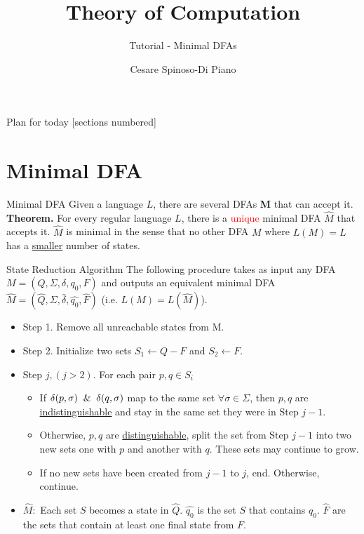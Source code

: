 \documentclass[10pt]{beamer}
\title{Theory of Computation}
\subtitle{Tutorial - Minimal DFAs}
\author{Cesare Spinoso-Di Piano}
\date{}
\begin{document}
\maketitle

\begin{frame}{Plan for today}
    [sections numbered]
    \tableofcontents[hideallsubsections]
\end{frame}


\section{Minimal DFA}

\begin{frame}{Minimal DFA}
    Given a language $L$, there are several DFAs \textbf{M} that can accept it.\\ \bigskip
    \textbf{Theorem.} For every regular language $L$, there is a \textcolor{red}{unique} minimal DFA $\hat{M}$ that accepts it. $\hat{M}$ is minimal in the sense that no other DFA $M$ where $L(M) = L$ has a \underline{smaller} number of states.
\end{frame}

\begin{frame}[t]{State Reduction Algorithm}
    The following procedure takes as input any DFA $M = (Q, \Sigma, \delta, q_0, F)$ and outputs an equivalent minimal DFA $\hat{M} = (\hat{Q}, \Sigma, \hat{\delta}, \hat{q_0}, \hat{F})$ (i.e. $L(M) = L(\hat{M})$).
    \begin{itemize}
        \item Step 1. Remove all unreachable states from M.
        \item Step 2. Initialize two sets $S_1 \leftarrow Q - F$ and $S_2 \leftarrow F$.
        \item Step $j, (j > 2)$. For each pair $p, q \in S_i$
              \begin{itemize}
                  \item If $\delta(p, \sigma) \And \delta(q, \sigma)$ map to the same set $\forall \sigma \in \Sigma$, then $p,q$ are \underline{indistinguishable} and stay in the same set they were in Step $j-1$.
                  \item Otherwise, $p,q$ are \underline{distinguishable}, split the set from Step $j-1$ into two new sets one with $p$ and another with $q$. These sets may continue to grow.
                  \item If no new sets have been created from $j-1$ to $j$, end. Otherwise, continue.
              \end{itemize}
        \item $\hat{M}:$ Each set $S$ becomes a state in $\hat{Q}$. $\hat{q_0}$ is the set $S$ that contains $q_0$. $\hat{F}$ are the sets that contain at least one final state from $F$.
    \end{itemize}
\end{frame}
\end{document}
